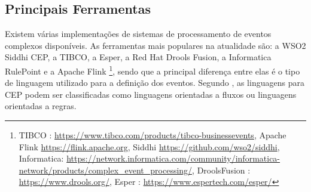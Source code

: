 




\subsection{Principais Ferramentas}
\label{sec:mainsoftwares}

Existem várias implementações de sistemas de processamento de eventos complexos disponíveis. As ferramentas mais populares na atualidade são: a WSO2 Siddhi CEP, a TIBCO,  a Esper, a Red Hat Drools Fusion, a Informatica RulePoint e a Apache Flink \footnote{TIBCO : \url{https://www.tibco.com/products/tibco-businessevents}, Apache Flink \url{https://flink.apache.org}, Siddhi \url{https://github.com/wso2/siddhi}, Informatica: \url{https://network.informatica.com/community/informatica-network/products/complex_event_processing/}, DroolsFusion : \url{https://www.drools.org/}, Esper : \url{https://www.espertech.com/esper/}}, sendo que a principal diferença entre elas é o tipo de linguagem utilizado para a definição dos eventos. Segundo \cite{Margara:2011:PFI:2002259.2002307}, as linguagens para CEP podem ser classificadas como linguagens orientadas a fluxos ou linguagens orientadas a regras. 

